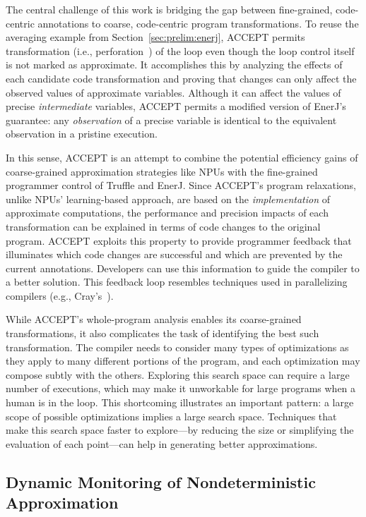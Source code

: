 The central challenge of this work is bridging the gap between fine-grained,
code-centric annotations to coarse, code-centric program transformations. To
reuse the averaging example from Section~\ref{sec:prelim:enerj}, ACCEPT
permits transformation (i.e., perforation~\cite{perforation}) of the
 loop even though the loop control itself is not marked as
approximate. It accomplishes this by analyzing the effects of each candidate
code transformation and proving that changes can only affect the
observed values of approximate variables. Although it can affect the values of
precise \emph{intermediate} variables, ACCEPT permits a modified version of
EnerJ's guarantee: any \emph{observation} of a precise variable is identical
to the equivalent observation in a pristine execution.

In this sense, ACCEPT is an attempt to combine the potential efficiency gains
of coarse-grained approximation strategies like NPUs with the fine-grained
programmer control of Truffle and EnerJ. Since ACCEPT's program relaxations,
unlike NPUs' learning-based approach, are based on the \emph{implementation}
of approximate computations, the performance and precision impacts of each
transformation can be explained in terms of code changes to the original
program. ACCEPT exploits this property to provide programmer feedback that
illuminates which code changes are successful and which are prevented by the
current annotations. Developers can use this information to guide the compiler
to a better solution. This feedback loop resembles techniques used in
parallelizing compilers (e.g., Cray's~\cite{canal}).

While ACCEPT's whole-program analysis enables its coarse-grained
transformations, it also complicates the task of identifying the best such
transformation. The compiler needs to consider many types of optimizations as
they apply to many different portions of the program, and each optimization
may compose subtly with the others. Exploring this search space can require
a large number of executions, which may make it unworkable for large programs
when a human is in the loop. This shortcoming illustrates an important
pattern: a large scope of possible optimizations implies a large search space.
Techniques that make this search space faster to explore---by reducing the
size or simplifying the evaluation of each point---can help in generating
better approximations.


\subsection{Dynamic Monitoring of Nondeterministic Approximation}
\label{sec:prelim:monitor}

